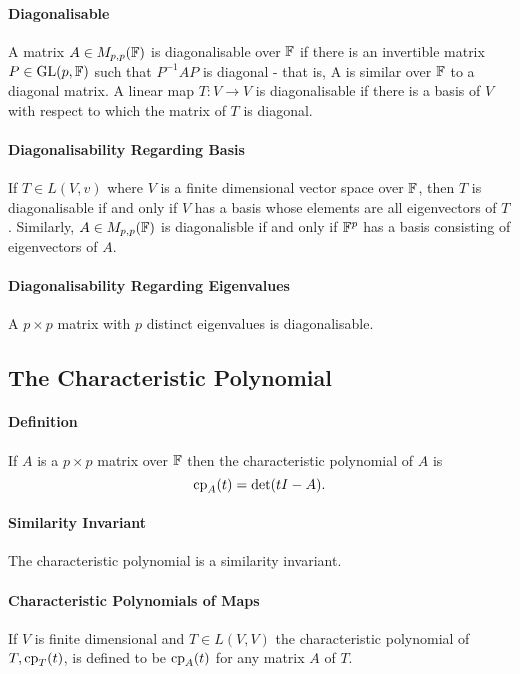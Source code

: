 \paragraph{Diagonalisable}
A matrix \(A \in M_{p,p}(\mathbb{F})\) is diagonalisable over \(\mathbb{F}\) if there is an invertible matrix \(P \in \operatorname{GL}(p,\mathbb{F})\) such that \(P^{-1}AP\) is diagonal - that is, A is similar over \(\mathbb{F}\) to a diagonal matrix. A linear map \(T: V \to V\) is diagonalisable if there is a basis of \(V\) with respect to which the matrix of \(T\) is diagonal.

\paragraph{Diagonalisability Regarding Basis}
If \(T \in L(V,v)\) where \(V\) is a finite dimensional vector space over \(\mathbb{F}\), then \(T\) is diagonalisable if and only if \(V\) has a basis whose elements are all eigenvectors of \(T\). Similarly, \(A \in M_{p,p}(\mathbb{F})\) is diagonalisble if and only if \(\mathbb{F}^p\) has a basis consisting of eigenvectors of \(A\). 

\paragraph{Diagonalisability Regarding Eigenvalues}
A \(p \times p\) matrix with \(p\) distinct eigenvalues is diagonalisable.

\subsection{The Characteristic Polynomial}
\paragraph{Definition}
If \(A\) is a \(p \times p\) matrix over \(\mathbb{F}\) then the characteristic polynomial of \(A\) is
\[\mathrm{cp}_A(t) = \det(tI - A).\]

\paragraph{Similarity Invariant}
The characteristic polynomial is a similarity invariant.

\paragraph{Characteristic Polynomials of Maps}
If \(V\) is finite dimensional and \(T \in L(V,V)\) the characteristic polynomial of \(T, \mathrm{cp}_T(t)\), is defined to be \(\mathrm{cp}_A(t)\) for any matrix \(A\) of \(T\).


